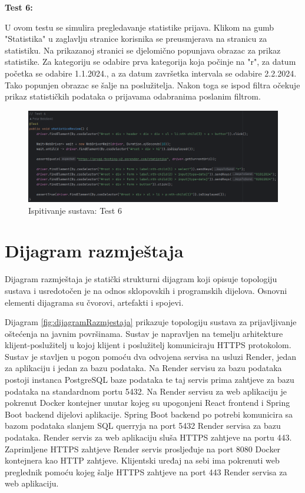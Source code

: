 		 	\textbf{Test 6:}
		 	
		 	U ovom testu se simulira pregledavanje statistike prijava. Klikom na gumb "Statistika" u zaglavlju stranice korisnika se preusmjerava na stranicu za statistiku.  Na prikazanoj stranici se djelomično popunjava obrazac za prikaz statistike. Za kategoriju se odabire prva kategorija koja počinje na "r", za datum početka se odabire 1.1.2024., a za datum završetka intervala se odabire 2.2.2024. Tako popunjen obrazac se šalje na poslužitelja. Nakon toga se ispod filtra očekuje prikaz statističkih podataka o prijavama odabranima poslanim filtrom.
		 	
		 	\begin{figure}[H]
		 		\includegraphics[width=\textwidth]{slike/SeleniumTest6.png} %
		 		\caption{Ispitivanje sustava: Test 6}
		 		\label{fig:SeleniumTest6} %
		 	\end{figure}
			
			\eject 
		
		
		\section{Dijagram razmještaja}
			
			Dijagram razmještaja je statički strukturni dijagram koji opisuje topologiju sustava i usredotočen je na odnos sklopovskih i programskih dijelova. Osnovni elementi dijagrama su čvorovi, artefakti i spojevi.
			
			Dijagram \ref{fig:dijagramRazmjestaja} prikazuje topologiju sustava za prijavljivanje oštećenja na javnim površinama. Sustav je napravljen na temelju arhitekture klijent-poslužitelj u kojoj klijent i poslužitelj komuniciraju HTTPS protokolom. Sustav je stavljen u pogon pomoću dva odvojena servisa na usluzi Render, jedan za aplikaciju i jedan za bazu podataka. Na Render servisu za bazu podataka postoji instanca PostgreSQL baze podataka te taj servis prima zahtjeve za bazu podataka na standardnom portu 5432. Na Render servisu za web aplikaciju je pokrenut Docker kontejner unutar kojeg su upogonjeni React frontend i Spring Boot backend dijelovi aplikacije. Spring Boot backend po potrebi komunicira sa bazom podataka slanjem SQL querryja na port 5432 Render servisa za bazu podataka. Render servis za web aplikaciju sluša HTTPS zahtjeve na portu 443. Zaprimljene HTTPS zahtjeve Render servis prosljeđuje na port 8080 Docker kontejnera kao HTTP zahtjeve. Klijentski uređaj na sebi ima pokrenuti web preglednik pomoću kojeg šalje HTTPS zahtjeve na port 443 Render servisa za web aplikaciju.
			
